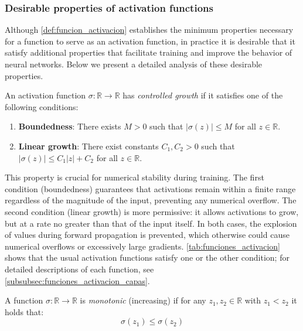 \subsubsection{Desirable properties of activation functions}

Although \autoref{def:funcion_activacion} establishes the minimum properties necessary for a function to serve as an activation function, in practice it is desirable that it satisfy additional properties that facilitate training and improve the behavior of neural networks. Below we present a detailed analysis of these desirable properties.

\begin{definition}\label{prop:acotacion_activacion}
	An activation function $\sigma: \mathbb{R} \to \mathbb{R}$ has \textit{controlled growth} if it satisfies one of the following conditions:
	\begin{enumerate}
		\item \textbf{Boundedness}: There exists $M > 0$ such that $|\sigma(z)| \leq M$ for all $z \in \mathbb{R}$.
		\item \textbf{Linear growth}: There exist constants $C_1, C_2 > 0$ such that $|\sigma(z)| \leq C_1|z| + C_2$ for all $z \in \mathbb{R}$.
	\end{enumerate}
\end{definition}

This property is crucial for numerical stability during training. The first condition (boundedness) guarantees that activations remain within a finite range regardless of the magnitude of the input, preventing any numerical overflow. The second condition (linear growth) is more permissive: it allows activations to grow, but at a rate no greater than that of the input itself. In both cases, the explosion of values during forward propagation is prevented, which otherwise could cause numerical overflows or excessively large gradients. \autoref{tab:funciones_activacion} shows that the usual activation functions satisfy one or the other condition; for detailed descriptions of each function, see \autoref{subsubsec:funciones_activacion_capas}.

\begin{definition}[Monotonicity]\label{prop:monotonia_activacion}
	A function $\sigma: \mathbb{R} \to \mathbb{R}$ is \textit{monotonic} (increasing) if for any $z_1, z_2 \in \mathbb{R}$ with $z_1 < z_2$ it holds that:
	\[
	\sigma(z_1) \leq \sigma(z_2)
	\]
\end{definition}

